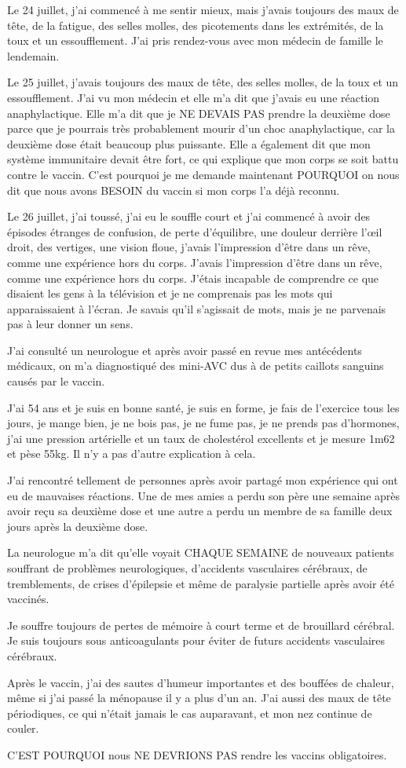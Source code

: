Le 24 juillet, j'ai commencé à me sentir mieux, mais j'avais toujours des maux
de tête, de la fatigue, des selles molles, des picotements dans les extrémités,
de la toux et un essoufflement. J'ai pris rendez-vous avec mon médecin de
famille le lendemain.

Le 25 juillet, j'avais toujours des maux de tête, des selles molles, de la toux
et un essoufflement. J'ai vu mon médecin et elle m'a dit que j'avais eu une
réaction anaphylactique. Elle m'a dit que je NE DEVAIS PAS prendre la deuxième
dose parce que je pourrais très probablement mourir d'un choc anaphylactique,
car la deuxième dose était beaucoup plus puissante. Elle a également dit que mon
système immunitaire devait être fort, ce qui explique que mon corps se soit
battu contre le vaccin. C'est pourquoi je me demande maintenant POURQUOI on nous
dit que nous avons BESOIN du vaccin si mon corps l'a déjà reconnu.

Le 26 juillet, j'ai toussé, j'ai eu le souffle court et j'ai commencé à avoir
des épisodes étranges de confusion, de perte d'équilibre, une douleur derrière
l'œil droit, des vertiges, une vision floue, j'avais l'impression d'être dans un
rêve, comme une expérience hors du corps. J'avais l'impression d'être dans un
rêve, comme une expérience hors du corps. J'étais incapable de comprendre ce que
disaient les gens à la télévision et je ne comprenais pas les mots qui
apparaissaient à l'écran. Je savais qu'il s'agissait de mots, mais je ne
parvenais pas à leur donner un sens.

J'ai consulté un neurologue et après avoir passé en revue mes antécédents
médicaux, on m'a diagnostiqué des mini-AVC dus à de petits caillots sanguins
causés par le vaccin.

J'ai 54 ans et je suis en bonne santé, je suis en forme, je fais de l'exercice
tous les jours, je mange bien, je ne bois pas, je ne fume pas, je ne prends pas
d'hormones, j'ai une pression artérielle et un taux de cholestérol excellents et
je mesure 1m62 et pèse 55kg. Il n'y a pas d'autre explication à cela.

J'ai rencontré tellement de personnes après avoir partagé mon expérience qui ont
eu de mauvaises réactions. Une de mes amies a perdu son père une semaine après
avoir reçu sa deuxième dose et une autre a perdu un membre de sa famille deux
jours après la deuxième dose.

La neurologue m'a dit qu'elle voyait CHAQUE SEMAINE de nouveaux patients
souffrant de problèmes neurologiques, d'accidents vasculaires cérébraux, de
tremblements, de crises d'épilepsie et même de paralysie partielle après avoir
été vaccinés.

Je souffre toujours de pertes de mémoire à court terme et de brouillard
cérébral. Je suis toujours sous anticoagulants pour éviter de futurs accidents
vasculaires cérébraux.

Après le vaccin, j'ai des sautes d'humeur importantes et des bouffées de
chaleur, même si j'ai passé la ménopause il y a plus d'un an. J'ai aussi des
maux de tête périodiques, ce qui n'était jamais le cas auparavant, et mon nez
continue de couler.

C'EST POURQUOI nous NE DEVRIONS PAS rendre les vaccins obligatoires.

